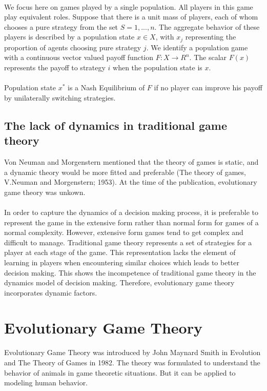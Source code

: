 \paragraph{}We focus here on games played by a single population. All players in this game play equivalent roles. Suppose that there is a unit mass of players, each of whom chooses a pure strategy from the set
 $S = {1, ... , n}$. The aggregate behavior of these players is described by a population state $x \in X$, with $x_j$ representing the proportion of agents choosing pure strategy $j$. We identify a population game with a continuous vector valued payoff function $ F:X \rightarrow R^n$. The scalar $F(x)$ represents the payoff to strategy $i$ when the population state is $x$.
\paragraph{}Population state $x^*$ is a Nash Equilibrium of $F$ if no player can improve his payoff by unilaterally switching strategies.
\subsection{The lack of dynamics in traditional game theory}
Von Neuman and Morgenstern mentioned that the theory of games is static, and a dynamic theory would be more fitted and preferable (The theory of games, V.Neuman and Morgenstern; 1953). At the time of the publication, evolutionary game theory was unkown.
\paragraph{}
In order to capture the dynamics of a decision making process, it is preferable to represent the game in the extensive form rather than normal form for games of a normal complexity. However, extensive form games tend to get complex and difficult to manage. Traditional game theory represents a set of strategies for a player at each stage of the game. This representation lacks the element of learning in players when encountering similar choices which leads to better decision making. This shows the incompetence of traditional game theory in the dynamics model of decision making. Therefore, evolutionary game theory incorporates dynamic factors.
\section{Evolutionary Game Theory}

Evolutionary Game Theory was introduced by John Maynard Smith in Evolution and The Theory of Games in 1982. The theory was formulated to understand the behavior of animals in game theoretic situations. But it can be applied to modeling human behavior.

